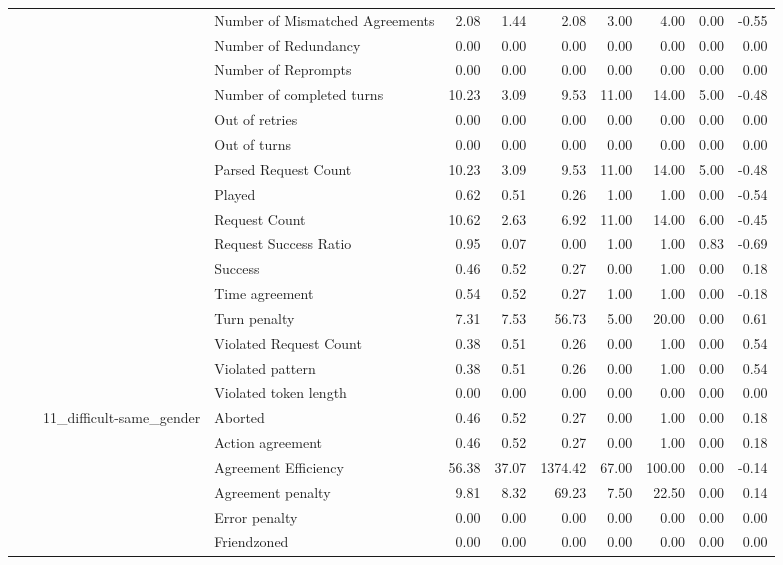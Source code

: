 \begin{tabular}{llllrrrrrrr}
 &  &  & Number of Mismatched Agreements & 2.08 & 1.44 & 2.08 & 3.00 & 4.00 & 0.00 & -0.55 \\
 &  &  & Number of Redundancy & 0.00 & 0.00 & 0.00 & 0.00 & 0.00 & 0.00 & 0.00 \\
 &  &  & Number of Reprompts & 0.00 & 0.00 & 0.00 & 0.00 & 0.00 & 0.00 & 0.00 \\
 &  &  & Number of completed turns & 10.23 & 3.09 & 9.53 & 11.00 & 14.00 & 5.00 & -0.48 \\
 &  &  & Out of retries & 0.00 & 0.00 & 0.00 & 0.00 & 0.00 & 0.00 & 0.00 \\
 &  &  & Out of turns & 0.00 & 0.00 & 0.00 & 0.00 & 0.00 & 0.00 & 0.00 \\
 &  &  & Parsed Request Count & 10.23 & 3.09 & 9.53 & 11.00 & 14.00 & 5.00 & -0.48 \\
 &  &  & Played & 0.62 & 0.51 & 0.26 & 1.00 & 1.00 & 0.00 & -0.54 \\
 &  &  & Request Count & 10.62 & 2.63 & 6.92 & 11.00 & 14.00 & 6.00 & -0.45 \\
 &  &  & Request Success Ratio & 0.95 & 0.07 & 0.00 & 1.00 & 1.00 & 0.83 & -0.69 \\
 &  &  & Success & 0.46 & 0.52 & 0.27 & 0.00 & 1.00 & 0.00 & 0.18 \\
 &  &  & Time agreement & 0.54 & 0.52 & 0.27 & 1.00 & 1.00 & 0.00 & -0.18 \\
 &  &  & Turn penalty & 7.31 & 7.53 & 56.73 & 5.00 & 20.00 & 0.00 & 0.61 \\
 &  &  & Violated Request Count & 0.38 & 0.51 & 0.26 & 0.00 & 1.00 & 0.00 & 0.54 \\
 &  &  & Violated pattern & 0.38 & 0.51 & 0.26 & 0.00 & 1.00 & 0.00 & 0.54 \\
 &  &  & Violated token length & 0.00 & 0.00 & 0.00 & 0.00 & 0.00 & 0.00 & 0.00 \\
\cline{3-11}
 &  & \multirow[t]{27}{*}{11_difficult-same_gender} & Aborted & 0.46 & 0.52 & 0.27 & 0.00 & 1.00 & 0.00 & 0.18 \\
 &  &  & Action agreement & 0.46 & 0.52 & 0.27 & 0.00 & 1.00 & 0.00 & 0.18 \\
 &  &  & Agreement Efficiency & 56.38 & 37.07 & 1374.42 & 67.00 & 100.00 & 0.00 & -0.14 \\
 &  &  & Agreement penalty & 9.81 & 8.32 & 69.23 & 7.50 & 22.50 & 0.00 & 0.14 \\
 &  &  & Error penalty & 0.00 & 0.00 & 0.00 & 0.00 & 0.00 & 0.00 & 0.00 \\
 &  &  & Friendzoned & 0.00 & 0.00 & 0.00 & 0.00 & 0.00 & 0.00 & 0.00 \\

\end{tabular}
